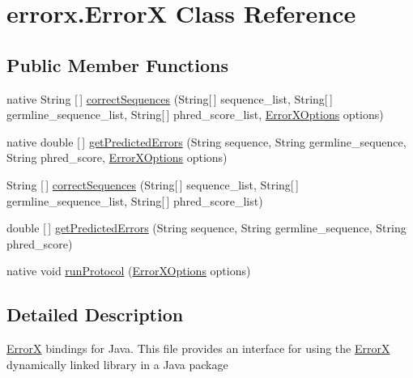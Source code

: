 \hypertarget{classerrorx_1_1_error_x}{}\section{errorx.\+ErrorX Class Reference}
\label{classerrorx_1_1_error_x}
\subsection*{Public Member Functions}
\begin{DoxyCompactItemize}
\item 
native String \mbox{[}$\,$\mbox{]} \mbox{\hyperlink{classerrorx_1_1_error_x_a96f670671af3f6e4193c4e83a547cf2b}{correct\+Sequences}} (String\mbox{[}$\,$\mbox{]} sequence\+\_\+list, String\mbox{[}$\,$\mbox{]} germline\+\_\+sequence\+\_\+list, String\mbox{[}$\,$\mbox{]} phred\+\_\+score\+\_\+list, \mbox{\hyperlink{classerrorx_1_1_error_x_options}{Error\+X\+Options}} options)
\item 
native double \mbox{[}$\,$\mbox{]} \mbox{\hyperlink{classerrorx_1_1_error_x_a114588f106010753dbb4c47aeabd10d1}{get\+Predicted\+Errors}} (String sequence, String germline\+\_\+sequence, String phred\+\_\+score, \mbox{\hyperlink{classerrorx_1_1_error_x_options}{Error\+X\+Options}} options)
\item 
String \mbox{[}$\,$\mbox{]} \mbox{\hyperlink{classerrorx_1_1_error_x_a12c9a526c2e14c24df262dd468b8e4bf}{correct\+Sequences}} (String\mbox{[}$\,$\mbox{]} sequence\+\_\+list, String\mbox{[}$\,$\mbox{]} germline\+\_\+sequence\+\_\+list, String\mbox{[}$\,$\mbox{]} phred\+\_\+score\+\_\+list)
\item 
double \mbox{[}$\,$\mbox{]} \mbox{\hyperlink{classerrorx_1_1_error_x_a2b05ab1d7a0a9e7747722e154055a760}{get\+Predicted\+Errors}} (String sequence, String germline\+\_\+sequence, String phred\+\_\+score)
\item 
native void \mbox{\hyperlink{classerrorx_1_1_error_x_a083d0d3215ef15747ca71f7e68c5b44b}{run\+Protocol}} (\mbox{\hyperlink{classerrorx_1_1_error_x_options}{Error\+X\+Options}} options)
\end{DoxyCompactItemize}


\subsection{Detailed Description}
\mbox{\hyperlink{classerrorx_1_1_error_x}{ErrorX}} bindings for Java. This file provides an interface for using the \mbox{\hyperlink{classerrorx_1_1_error_x}{ErrorX}} dynamically linked library in a Java package 

